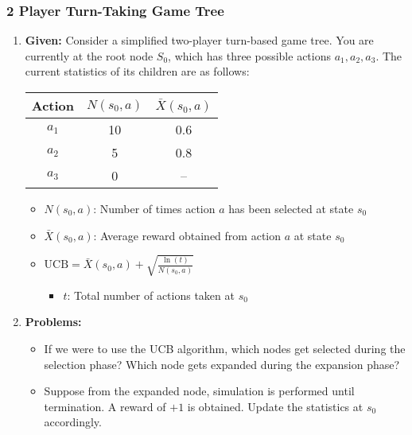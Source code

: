 \subsubsection{2 Player Turn-Taking Game Tree}
\begin{example}
    \begin{enumerate}
        \item \textbf{Given:} Consider a simplified two-player turn-based game tree. You are currently at the root node $S_0$, which has three possible actions $a_1, a_2, a_3$. The current statistics of its children are as follows:
        \vspace{1em}
        \begin{center}
        \begin{tabular}{ccc}
        \toprule
        \textbf{Action} & $N(s_0, a)$ & $\bar{X}(s_0, a)$ \\
        \midrule
        $a_1$ & 10 & 0.6 \\
        $a_2$ & 5 & 0.8 \\
        $a_3$ & 0 & -- \\
        \bottomrule
        \end{tabular}
        \end{center}
        \vspace{1em}
        \begin{itemize}
            \item $N(s_0, a)$: Number of times action $a$ has been selected at state $s_0$
            \item $\bar{X}(s_0, a)$: Average reward obtained from action $a$ at state $s_0$
            \item $\text{UCB} = \bar{X}(s_0, a) + \sqrt{\frac{\ln(t)}{N(s_0, a)}}$ 
            \begin{itemize}
                \item $t$: Total number of actions taken at $s_0$
            \end{itemize}
        \end{itemize}
        \item \textbf{Problems:} 
        \begin{itemize}
            \item If we were to use the UCB algorithm, which nodes get selected during the selection phase? Which node gets expanded during the expansion phase?
            \item Suppose from the expanded node, simulation is performed until termination. A reward of $+1$ is obtained. Update the statistics at $s_0$ accordingly.

\end{itemize}
\end{enumerate}
\end{example}
